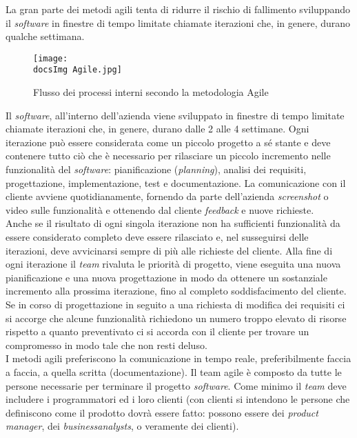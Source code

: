 La gran parte dei metodi agili tenta di ridurre il rischio di fallimento sviluppando il \textit{software\gloss} in finestre di tempo limitate chiamate iterazioni che, in genere, durano qualche settimana.

\begin{figure}[H]
	\centering
	\texttt{[image: \\docsImg Agile.jpg]}
	\caption{Flusso dei processi interni secondo la metodologia Agile}
	\label{fig:Flusso dei processi interni}
\end{figure}

Il \textit{software\gloss}, all'interno dell'azienda viene sviluppato in finestre di tempo limitate chiamate iterazioni che, in genere, durano dalle 2 alle 4 settimane. Ogni iterazione pu\`o essere considerata come un piccolo progetto a sé stante e deve contenere tutto ciò che è necessario per rilasciare un piccolo incremento nelle funzionalità del \textit{software\gloss}: pianificazione (\textit{planning}), analisi dei requisiti, progettazione, implementazione, test e documentazione. La comunicazione con il cliente avviene quotidianamente, fornendo da parte dell'azienda \textit{screenshot} o video sulle funzionalit\`a e ottenendo dal cliente \textit{feedback} e nuove richieste.
\\
Anche se il risultato di ogni singola iterazione non ha sufficienti funzionalità da essere considerato completo deve essere rilasciato e, nel susseguirsi delle iterazioni, deve avvicinarsi sempre di più alle richieste del cliente. Alla fine di ogni iterazione il \textit{team} rivaluta le priorit\`a di progetto, viene eseguita una nuova pianificazione e una nuova progettazione in modo da ottenere un sostanziale incremento alla prossima iterazione, fino al completo soddisfacimento del cliente. Se in corso di progettazione in seguito a una richiesta di modifica dei requisiti ci si accorge che alcune funzionalit\`a richiedono un numero troppo elevato di risorse rispetto a quanto preventivato ci si accorda con il cliente per trovare un compromesso in modo tale che non resti deluso.
\\
I metodi agili preferiscono la comunicazione in tempo reale, preferibilmente faccia a faccia, a quella scritta (documentazione). Il team agile è composto da tutte le persone necessarie per terminare il progetto \textit{software\gloss}. Come minimo il \textit{team} deve includere i programmatori ed i loro clienti (con clienti si intendono le persone che definiscono come il prodotto dovrà essere fatto: possono essere dei \textit{product manager}, dei \textit{business\gloss analysts}, o veramente dei clienti).

